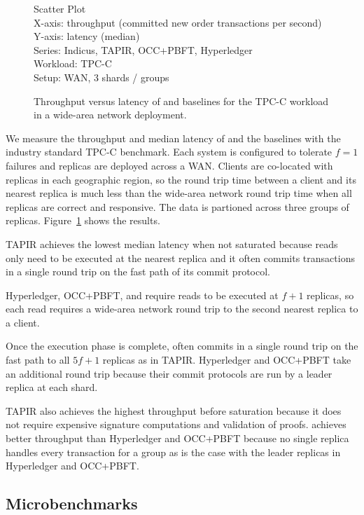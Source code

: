\begin{figure}
  Scatter Plot\\
  X-axis: throughput (committed new order transactions per second)\\
  Y-axis: latency (median)\\
  Series: Indicus, TAPIR, OCC+PBFT, Hyperledger\\
  Workload: TPC-C\\
  Setup: WAN, 3 shards / groups\\
  \caption{Throughput versus latency of \sys{} and baselines for the TPC-C
  workload in a wide-area network deployment.}
  \label{fig:tpcc-tput-lat}
\end{figure}

We measure the throughput and median latency of \sys{} and the baselines with the
industry standard TPC-C benchmark. Each system is configured to tolerate $f=1$
failures and replicas are deployed across a WAN. Clients are co-located with
replicas in each geographic region, so the round trip time between a client and
its nearest replica is much less than the wide-area network round trip time when
all replicas are correct and responsive. The data is partioned across
three groups of replicas. Figure~\ref{fig:tpcc-tput-lat} shows the results.

TAPIR achieves the lowest median latency when not saturated because reads only
need to be executed at the nearest replica and it often commits transactions in
a single round trip on the fast path of its commit protocol.

Hyperledger, OCC+PBFT, and \sys{} require reads to be
executed at $f+1$ replicas, so each read requires a wide-area network round trip
to the second nearest replica to a client.

Once the execution phase is complete,
\sys{} often commits in a single round trip on the fast path to all $5f+1$
replicas as in TAPIR. Hyperledger and OCC+PBFT take an additional round trip
because their commit protocols are run by a leader replica at each shard.

TAPIR also achieves the highest throughput before saturation because it does not
require expensive signature computations and validation of proofs. \sys{} achieves
better throughput than Hyperledger and OCC+PBFT because no single replica handles
every transaction for a group as is the case with the leader replicas in Hyperledger
and OCC+PBFT.

\subsection{Microbenchmarks}

